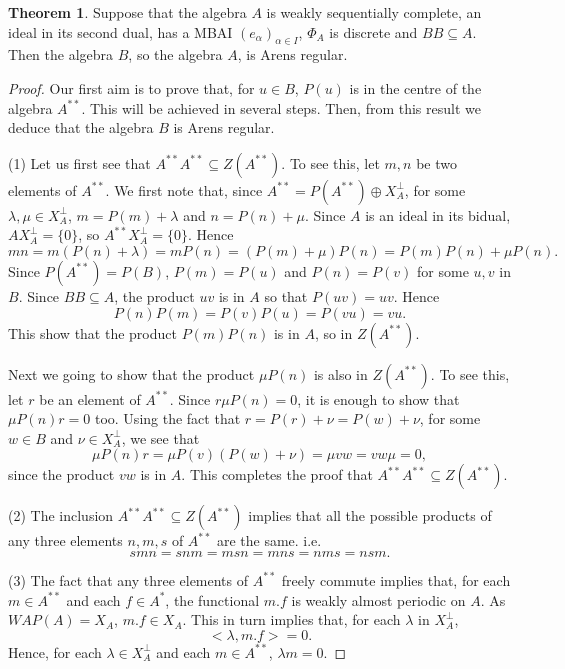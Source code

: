 \documentclass[12pt, twoside, leqno]{article}
\theoremstyle{definition}
\newtheorem{theorem}{Theorem}[section]
\theoremstyle{definition}
\numberwithin{equation}{section}
\begin{document}
\begin{theorem} Suppose that the algebra $ A $ is weakly sequentially complete, an ideal in its second dual, has a MBAI $ (e_{\alpha})_{\alpha\in I} $, $\Phi_{A}$ is discrete and $ BB\subseteq A $. Then the algebra $B$, so the algebra $A$, is Arens regular.
	
\end{theorem}
\begin{proof} Our first aim is to prove that, for $u\in B$, $P(u)$ is in the centre of the algebra $A^{**}$. This will be achieved in several steps. Then, from this result we deduce that the algebra $B$ is Arens regular. \vspace{2mm}
	
(1) Let us first see that $A^{**}A^{**}\subseteq Z(A^{**})$. To see this,	let $m,n$ be two elements of $A^{**}$. We first note that, since $ A^{**}=P(A^{**})\oplus X_{A}^{\perp}$, for some $\lambda,\mu\in X_{A}^{\perp}$,  $m=P(m)+\lambda$ and $n=P(n)+\mu$. Since $A$ is an ideal in its bidual,  $AX_{A}^{\perp}=\{0\}$, so  $A^{**}X_{A}^{\perp}=\{0\}$. Hence $$mn=m(P(n)+\lambda)=mP(n)=(P(m)+\mu)P(n)=P(m)P(n)+\mu P(n).$$ Since $P(A^{**})=P(B)$, $P(m)=P(u)$ and $P(n)=P(v)$ for some $u,v$ in $B$. Since $BB\subseteq A$, the product $uv$ is in $A$ so that $P(uv)=uv$. Hence $$P(n)P(m)=P(v)P(u)=P(vu)=vu.$$ This show that the product $P(m)P(n)$ is in $A$, so in $Z(A^{**})$. \vspace{1mm}

Next we going to show that the product $\mu P(n)$ is also in $Z(A^{**})$. To see this, let $r$ be an element of $A^{**}$. Since $r\mu P(n)=0$, it is enough to show that $\mu P(n)r=0$ too. Using the fact that $r=P(r)+\nu=P(w)+\nu$, for some $w\in B$ and $\nu\in X_{A}^{\perp}$, we see that $$\mu P(n)r=\mu P(v)(P(w)+\nu)=\mu vw=vw\mu=0,$$ since the product $vw$ is in $A$. This completes the proof that $A^{**}A^{**}\subseteq Z(A^{**})$. \vspace{2mm}

(2) The inclusion $A^{**}A^{**}\subseteq Z(A^{**})$ implies that all the possible products of any three elements $n,m,s$ of $A^{**}$ are the same. i.e. $$smn=snm=msn=mns=nms=nsm.$$ \vspace{2mm}

(3) The fact that any three elements of $A^{**}$ freely commute implies that, for each $m\in A^{**}$ and each $f\in A^{*}$, the functional $m.f$ is weakly almost periodic on $A$. As $WAP(A)=X_{A}$, $m.f\in X_{A}$. This in turn implies that, for each $\lambda$ in $X_{A}^{\perp}$, $$<\lambda,m.f>=0.$$ Hence, for each $\lambda \in X_{A}^{\perp}$ and each $m\in A^{**}$, $\lambda m=0$. \vspace{2mm}


\end{proof}
\end{document}
